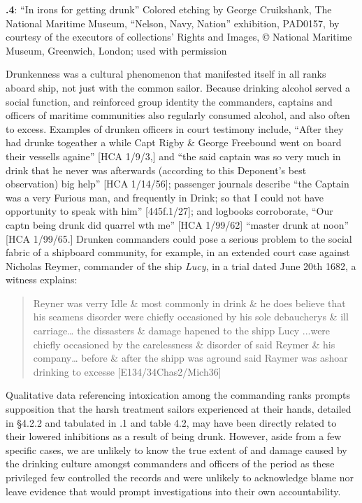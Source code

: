  

\textbf{.4}: “In irons for getting drunk” Colored etching by George Cruikshank, The National Maritime Museum, “Nelson, Navy, Nation” exhibition, PAD0157, by courtesy of the executors of collections’ Rights and Images, © National Maritime Museum, Greenwich, London; used with permission

Drunkenness was a cultural phenomenon that manifested itself in all ranks aboard ship, not just with the common sailor. Because drinking alcohol served a social function, and reinforced group identity \citep[13,]{Fury2015} the commanders, captains and officers of maritime communities also regularly consumed alcohol, and also often to excess. Examples of drunken officers in court testimony include, “After they had drunke togeather a while Capt Rigby \& George Freebound went on board their vessells againe” [HCA 1/9/3,] and “the said captain was so very much in drink that he never was afterwards (according to this Deponent’s best observation) big help” [HCA 1/14/56]; passenger journals describe “the Captain was a very Furious man, and frequently in Drink; so that I could not have opportunity to speak with him” [445f.1/27]; and logbooks corroborate, “Our captn being drunk did quarrel wth me” [HCA 1/99/62] “master drunk at noon” [HCA 1/99/65.] Drunken commanders could pose a serious problem to the social fabric of a shipboard community, for example, in an extended court case against Nicholas Reymer, commander of the ship \textit{Lucy}, in a trial dated June 20th 1682, a witness explains:

\begin{quotation}
Reyner was verry Idle \& most commonly in drink \& he does believe that his seamens disorder were chiefly occasioned by his sole debaucherys \& ill carriage… the dissasters \& damage hapened to the shipp Lucy ...were chiefly occasioned by the carelessness \& disorder of said Reymer \& his company… before \& after the shipp was aground said Raymer was ashoar drinking to excesse  [E134/34Chas2/Mich36]\end{quotation}

Qualitative data referencing intoxication among the commanding ranks prompts supposition that the harsh treatment sailors experienced at their hands, detailed in §4.2.2 and tabulated in .1 and table 4.2, may have been directly related to their lowered inhibitions as a result of being drunk. However, aside from a few specific cases, we are unlikely to know the true extent of and damage caused by the drinking culture amongst commanders and officers of the period as these privileged few controlled the records and were unlikely to acknowledge blame nor leave evidence that would prompt investigations into their own accountability.

